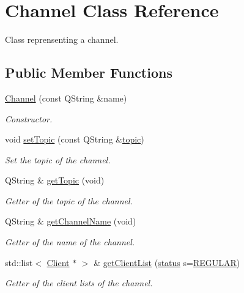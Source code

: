 \hypertarget{class_channel}{\section{Channel Class Reference}
\label{class_channel}
}


Class reprensenting a channel.  


\subsection*{Public Member Functions}
\begin{DoxyCompactItemize}
\item 
\hyperlink{class_channel_a8feadb7e1960104caee0b3fa91925480}{Channel} (const Q\-String \&name)
\begin{DoxyCompactList}\small\item\em Constructor. \end{DoxyCompactList}\item 
void \hyperlink{class_channel_a23eab8d240c3a42711f86d0f9d92f680}{set\-Topic} (const Q\-String \&\hyperlink{classtopic}{topic})
\begin{DoxyCompactList}\small\item\em Set the topic of the channel. \end{DoxyCompactList}\item 
Q\-String \& \hyperlink{class_channel_a1514edfc06a6c6f39a7de5dc28d07ccc}{get\-Topic} (void)
\begin{DoxyCompactList}\small\item\em Getter of the topic of the channel. \end{DoxyCompactList}\item 
Q\-String \& \hyperlink{class_channel_af0f7c900b79dcea96263857f49911ace}{get\-Channel\-Name} (void)
\begin{DoxyCompactList}\small\item\em Getter of the name of the channel. \end{DoxyCompactList}\item 
std\-::list$<$ \hyperlink{class_client}{Client} $\ast$ $>$ \& \hyperlink{class_channel_ab2b33ebbbcee6504ad5fb2a8c4cb4d8d}{get\-Client\-List} (\hyperlink{channel_8h_a015eb90e0de9f16e87bd149d4b9ce959}{status} s=\hyperlink{channel_8h_a015eb90e0de9f16e87bd149d4b9ce959afc488491175a6dac9e5881e363ad4c41}{R\-E\-G\-U\-L\-A\-R})
\begin{DoxyCompactList}\small\item\em Getter of the client lists of the channel. \end{DoxyCompactList}\item 

\end{DoxyCompactItemize}
